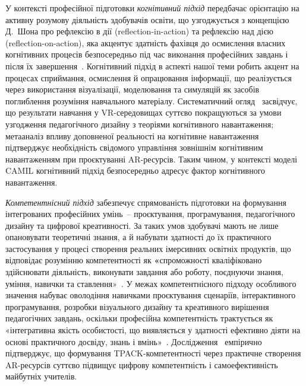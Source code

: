 У контексті професійної підготовки \emph{когнітивний підхід} передбачає орієнтацію на активну розумову діяльність здобувачів освіти, що узгоджується з концепцією Д.~Шона про рефлексію в дії (reflection-in-action) та рефлексію над дією (reflection-on-action), яка акцентує здатність фахівця до осмислення власних когнітивних процесів безпосередньо під час виконання професійних завдань і після їх завершення~\cite{ReflexiveApproach2018}. Когнітивний підхід в аспекті нашої теми робить акцент на процесах сприймання, осмислення й опрацювання інформації, що реалізується через використання візуалізації, моделювання та симуляцій як засобів поглиблення розуміння навчального матеріалу. Систематичний огляд~\cite{Mallek2024SynthesizingVR} засвідчує, що результати навчання у VR-середовищах суттєво покращуються за умови узгодження педагогічного дизайну з теоріями когнітивного навантаження; метааналіз впливу доповненої реальності на когнітивне навантаження~\cite{Buchner2021CogLoad} підтверджує необхідність свідомого управління зовнішнім когнітивним навантаженням при проєктуванні AR-ресурсів. Таким чином, у контексті моделі CAMIL когнітивний підхід безпосередньо адресує фактор когнітивного навантаження.

\emph{Компетентнісний підхід} забезпечує спрямованість підготовки на формування інтегрованих професійних умінь~-- проєктування, програмування, педагогічного дизайну та цифрової креативності. За таких умов здобувачі мають не лише опановувати теоретичні знання, а й набувати здатності до їх практичного застосування у процесі створення реальних імерсивних освітніх продуктів, що відповідає розумінню компетентності як \textbf{«}спроможності кваліфіковано здійснювати діяльність, виконувати завдання або роботу, поєднуючи знання, уміння, навички та ставлення»~\cite[c.~240]{Dychkivska2012Innovative}. У межах компетентнісного підходу особливого значення набуває оволодіння навичками проєктування сценаріїв, інтерактивного програмування, розробки візуального дизайну та креативного вирішення педагогічних завдань, оскільки професійна компетентність трактується як «інтегративна якість особистості, що виявляється у здатності ефективно діяти на основі практичного досвіду, знань і вмінь»~\cite[c.~96]{Dychkivska2012Innovative}. Дослідження~\cite{BeldaMedina2022TPACK} емпірично підтверджує, що формування TPACK-компетентності через практичне створення AR-ресурсів суттєво підвищує цифрову компетентність і самоефективність майбутніх учителів.

